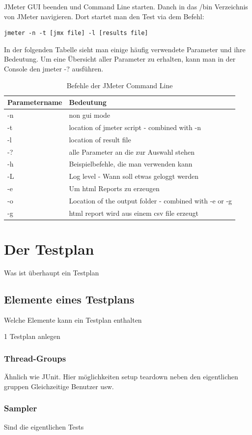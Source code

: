 \documentclass[a4paper,12pt]{article}
\begin{document}
JMeter GUI beenden und Command Line starten. Danch in das /bin Verzeichnis von JMeter navigieren. Dort startet man den Test via dem Befehl:
\begin{lstlisting}[style=Cpp]
  jmeter -n -t [jmx file] -l [results file]
\end{lstlisting}
In der folgenden Tabelle sieht man einige häufig verwendete Parameter und ihre Bedeutung. Um eine Übersicht aller Parameter zu erhalten, kann man in der Console den jmeter -? ausführen.
\begin{table}[H]
	\centering
	\begin{tabular}{|l|l|}
		\hline
		\textbf{Parametername} & \textbf{Bedeutung} \\
		\hline
		-n & non gui mode \\
		-t & location of jmeter script - combined with -n \\
		-l & location of result file \\
		-? & alle Parameter an die zur Auswahl stehen \\
		-h & Beispielbefehle, die man verwenden kann \\
		-L & Log level - Wann soll etwas geloggt werden \\
		-e & Um html Reports zu erzeugen\\
		-o & Location of the output folder - combined with -e or -g \\
		-g & html report wird aus einem csv file erzeugt \\ 
		\hline
	\end{tabular}
	\caption[tab_parameter_non_gui]{Befehle der JMeter Command Line}
	\label{tab_parameter_non_gui}
\end{table}


\section{Der Testplan}
Was ist überhaupt ein Testplan
\subsection{Elemente eines Testplans}
Welche Elemente kann ein Testplan enthalten

1 Testplan anlegen
\subsubsection{Thread-Groups}
Ähnlich wie JUnit. Hier möglichkeiten setup teardown neben den eigentlichen gruppen
Gleichzeitige Benutzer usw.
\subsubsection{Sampler}
Sind die eigentlichen Tests
\end{document}
